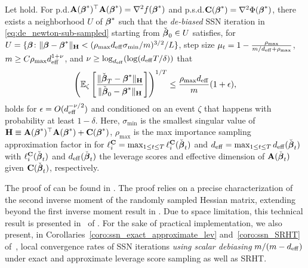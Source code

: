\documentclass[11pt,a4paper]{article}
\begin{document}
\begin{theorem}\label{theom:RS-convergence}
Let  hold. 
For p.d.\@ $\mathbf{A}(\boldsymbol{\beta}^{\ast})^\top\mathbf{A}(\boldsymbol{\beta}^{\ast})= \nabla^2f(\boldsymbol{\beta}^{\ast})$ and p.s.d.\@ $\mathbf{C}(\boldsymbol{\beta}^{\ast})=\nabla^2\Phi(\boldsymbol{\beta}^{\ast})$, there exists a neighborhood $U$ of $\boldsymbol{\beta}^{\ast}$ such that the \emph{de-biased} SSN iteration in \eqref{eq:de_newton-sub-sampled} starting from $\check{\boldsymbol{\beta}}_0 \in U$ satisfies, for $U=\{\boldsymbol{\beta} \colon \|\boldsymbol{\beta}-\boldsymbol{\beta}^{\ast}\|_{\mathbf{H}}<(\rho_{\max} d_{\mathrm{eff}} \sigma_{\min}/m)^{3/2}/L\}$, step size $\mu_t=1-\frac{\rho_{\max} }{m/d_{\mathrm{eff}} + \rho_{\max} }$, $m\geq C\rho_{\max} d^{1+\nu}_{\mathrm{eff}}$, and $\nu \geq \log_{d_{\mathrm{eff}}} (\log (d_{\mathrm{eff}}T/\delta) )$ that
\begin{equation}\label{eq:result_conver}
   \left( {\mathbb{E}}_{\zeta}\left[\frac{\|\check{\boldsymbol{\beta}}_T-\boldsymbol{\beta}^{\ast}\|_{\mathbf{H}}}{\|\check{\boldsymbol{\beta}}_0-\boldsymbol{\beta}^{\ast}\|_{\mathbf{H}}}\right]\right)^{1/T}\leq \frac{\rho_{\max} d_{\mathrm{eff}}}{m} ( 1+ \epsilon), 
\end{equation}
holds for $\epsilon= O( d_{\mathrm{eff}}^{-\nu/2})$ and conditioned on an event $\zeta$ that happens with probability at least $1-\delta$.
Here, $\sigma_{\min}$ is the smallest singular value of $\mathbf{H} \equiv\mathbf{A}(\boldsymbol{\beta}^{\ast})^\top \mathbf{A}(\boldsymbol{\beta}^{\ast})+\mathbf{C}(\boldsymbol{\beta}^{\ast})$, $\rho_{\max}$ is the max importance sampling approximation factor in  for $\ell_{i}^{\mathbf{C}}=\max_{1\leq t \leq T}\ell_{i}^{\mathbf{C}}(\check{\boldsymbol{\beta}}_t)$ and $d_{\mathrm{eff}}=\max_{1\leq t \leq T}d_{\mathrm{eff}}(\check{\boldsymbol{\beta}}_t)$ with $\ell_{i}^{\mathbf{C}}(\check{\boldsymbol{\beta}}_t)$ and $d_{\mathrm{eff}}(\check{\boldsymbol{\beta}}_t)$ the leverage scores and effective dimension of $\mathbf{A}(\check{\boldsymbol{\beta}}_t)$ given $\mathbf{C}(\check{\boldsymbol{\beta}}_t)$, respectively.
\end{theorem}

The proof of  can be found in .
The proof relies on a precise characterization of the second inverse moment of the randomly sampled Hessian matrix, extending beyond the first inverse moment result in . 
Due to space limitation, this technical result is presented in~ of . 
For the sake of practical implementation, we also present, in Corollaries~\ref{coro:ssn_exact_approximate_lev} and~\ref{coro:ssn_SRHT} of~, local convergence rates of SSN iterations \emph{using scalar debiasing} $m/(m-d_{\mathrm{eff}})$ under exact and approximate leverage score sampling as well as SRHT.
\end{document}
